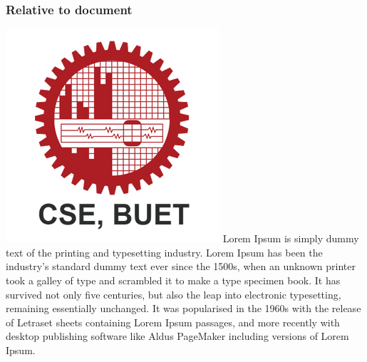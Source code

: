 \documentclass[twocolumn]{article}
\begin{document}
\pagebreak

\subsubsection{Relative to document}
\includegraphics[width=.5\columnwidth]{Images/CSE_BUET.png}
Lorem Ipsum is simply dummy text of the printing and typesetting industry. Lorem Ipsum has been the industry's standard dummy text ever since the 1500s, when an unknown printer took a galley of type and scrambled it to make a type specimen book. It has survived not only five centuries, but also the leap into electronic typesetting, remaining essentially unchanged. It was popularised in the 1960s with the release of Letraset sheets containing Lorem Ipsum passages, and more recently with desktop publishing software like Aldus PageMaker including versions of Lorem Ipsum.

\pagebreak
\end{document}
